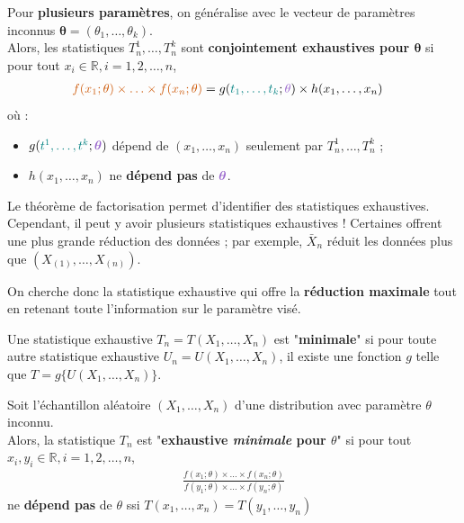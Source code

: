 \documentclass[10pt, french]{article}
\begin{document}
\begin{multicols*}{2}
\begin{definitionNOHFILLprop}
Pour \textbf{plusieurs paramètres}, on généralise avec le vecteur de paramètres inconnus $\bm{\theta}	=	(\theta_{1}, \dots, \theta_{k})$.\\
Alors, les statistiques $T^{1}_{n}, \dots, T^{k}_{n}$ sont \textbf{conjointement exhaustives pour $\bm{\theta}$} si pour tout $x_{i}	\in \mathbb{R}, i = 1, 2, \dots, n$, 
\begin{align*}
	{\color{burntorange}f(x_{1}; \theta) \times \hdots \times f(x_{n}; \theta)}
	&=	g({\color{teal}t_{1}, \dots, t_{k}}; {\color{amethyst}\theta}) \times h(x_{1}, \dots, x_{n})
\end{align*}
où :
\begin{itemize}
	\item	$g({\color{teal}t^{1}, \dots, t^{k}}; {\color{amethyst}\bm{\theta}})$ dépend de $(x_{1}, \dots, x_{n})$ seulement par $T^{1}_{n}, \dots, T^{k}_{n}$ ;
	\item	$h(x_{1}, \dots, x_{n})$ ne \textbf{dépend pas} de ${\color{amethyst}\bm{\theta}}$.
\end{itemize}	
\end{definitionNOHFILLprop}

Le théorème de factorisation permet d'identifier des statistiques exhaustives. Cependant, il peut y avoir plusieurs statistiques exhaustives ! Certaines offrent une plus grande réduction des données ; par exemple, $\bar{X}_{n}$ réduit les données plus que $(X_{(1)}, \dots, X_{(n)})$. 

On cherche donc la statistique exhaustive qui offre la \textbf{réduction maximale} tout en retenant toute l'information sur le paramètre visé.

\begin{definitionNOHFILL}
Une statistique exhaustive $T_{n}	=	T(X_{1}, \dots, X_{n})$ est "\textbf{minimale}" si pour toute autre statistique exhaustive $U_{n}	=	U(X_{1}, \dots, X_{n})$, il existe une fonction $g$ telle que $T	=	g\{U(X_{1}, \dots, X_{n})\}$.

\begin{definitionNOHFILLprop}
Soit l'échantillon aléatoire $(X_{1}, \dots, X_{n})$ d'une distribution avec paramètre $\theta$ inconnu.\\
Alors, la statistique $T_{n}$ est "\textbf{exhaustive \textit{minimale} pour $\theta$}" si pour tout $x_{i}, y_{i}	\in \mathbb{R}, i = 1, 2, \dots, n$,
\begin{align*}
	\frac{f(x_{1}; \theta) \times \hdots \times f(x_{n}; \theta)}{f(y_{1}; \theta) \times \hdots \times f(y_{n}; \theta)}
\end{align*}
ne \textbf{dépend pas} de $\theta$ ssi $T(x_{1}, \dots, x_{n})	=	T(y_{1}, \dots, y_{n})$
\end{definitionNOHFILLprop}


\end{definitionNOHFILL}
\end{multicols*}
\end{document}
